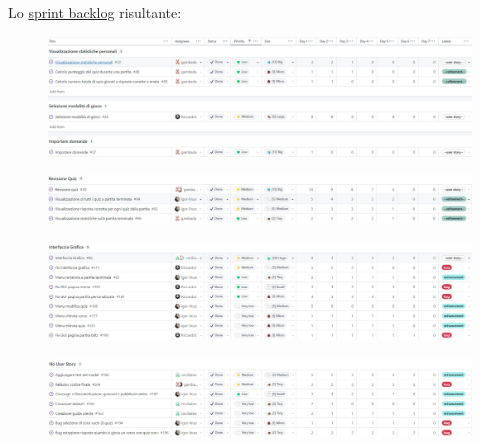 Lo \href{https://github.com/orgs/ISIQuiz/projects/3/views/22}{sprint backlog} risultante:

\begin{figure}[H]
    \centering
    \includegraphics[width=\textwidth]{process/Img/Sprint10BL1.jpg}
    \label{fig:Sprint10BL1}
\end{figure}

\begin{figure}[H]
    \centering
    \includegraphics[width=\textwidth]{process/Img/Sprint10BL2.jpg}
    \label{fig:Sprint10BL2}
\end{figure}

\begin{figure}[H]
    \centering
    \includegraphics[width=\textwidth]{process/Img/Sprint10BL3.jpg}
    \label{fig:Sprint10BL3}
\end{figure}

\begin{figure}[H]
    \centering
    \includegraphics[width=\textwidth]{process/Img/Sprint10BL4.jpg}
    \label{fig:Sprint10BL4}
\end{figure}